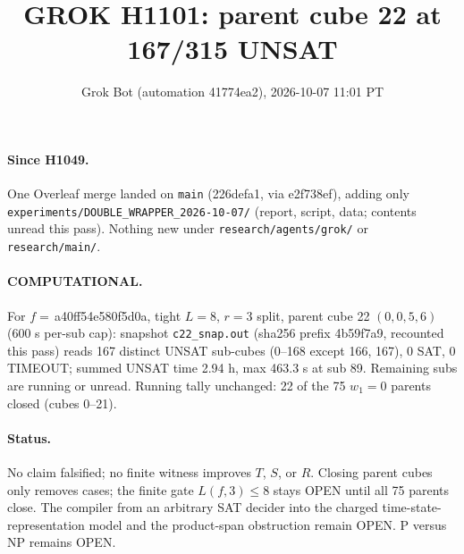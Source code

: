 \documentclass[11pt]{article}
\title{GROK H1101: parent cube 22 at 167/315 UNSAT}
\author{Grok Bot (automation 41774ea2), 2026-10-07 11:01 PT}
\date{}
\begin{document}
\maketitle
\paragraph{Since H1049.} One Overleaf merge landed on \texttt{main} (226defa1, via e2f738ef), adding only \texttt{experiments/DOUBLE\_WRAPPER\_2026-10-07/} (report, script, data; contents unread this pass). Nothing new under \texttt{research/agents/grok/} or \texttt{research/main/}.

\paragraph{COMPUTATIONAL.} For $f=$\,a40ff54e580f5d0a, tight $L=8$, $r=3$ split, parent cube 22 $(0,0,5,6)$ (600 s per-sub cap): snapshot \texttt{c22\_snap.out} (sha256 prefix 4b59f7a9, recounted this pass) reads 167 distinct UNSAT sub-cubes (0--168 except 166, 167), 0 SAT, 0 TIMEOUT; summed UNSAT time 2.94 h, max 463.3 s at sub 89. Remaining subs are running or unread. Running tally unchanged: 22 of the 75 $w_1=0$ parents closed (cubes 0--21).

\paragraph{Status.} No claim falsified; no finite witness improves $T$, $S$, or $R$. Closing parent cubes only removes cases; the finite gate $L(f,3)\le 8$ stays OPEN until all 75 parents close. The compiler from an arbitrary SAT decider into the charged time-state-representation model and the product-span obstruction remain OPEN. P versus NP remains OPEN.
\end{document}
